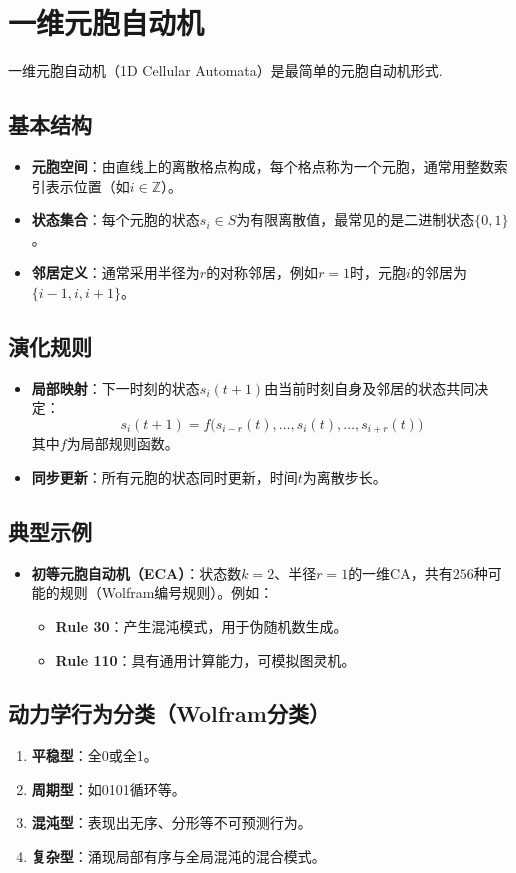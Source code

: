 \documentclass[forprint]{WHUBachelor}
\begin{document}
\section{一维元胞自动机}
一维元胞自动机（1D Cellular Automata）是最简单的元胞自动机形式.

\subsection{基本结构}
\begin{itemize}
    \item \textbf{元胞空间}：由直线上的离散格点构成，每个格点称为一个元胞，通常用整数索引表示位置（如$i \in \mathbb{Z}$）。
    \item \textbf{状态集合}：每个元胞的状态$s_i \in S$为有限离散值，最常见的是二进制状态$\{0,1\}$。
    \item \textbf{邻居定义}：通常采用半径为$r$的对称邻居，例如$r=1$时，元胞$i$的邻居为$\{i-1, i, i+1\}$。
\end{itemize}

\subsection{演化规则}
\begin{itemize}
    \item \textbf{局部映射}：下一时刻的状态$s_i(t+1)$由当前时刻自身及邻居的状态共同决定：
    $$
    s_i(t+1) = f\big(s_{i-r}(t), \ldots, s_i(t), \ldots, s_{i+r}(t)\big)
    $$
    其中$f$为局部规则函数。
    \item \textbf{同步更新}：所有元胞的状态同时更新，时间$t$为离散步长。
\end{itemize}

\subsection{典型示例}
\begin{itemize}
    \item \textbf{初等元胞自动机（ECA）}：状态数$k=2$、半径$r=1$的一维CA，共有$256$种可能的规则（Wolfram编号规则）。例如：
    \begin{itemize}
        \item \textbf{Rule 30}：产生混沌模式，用于伪随机数生成。
        \item \textbf{Rule 110}：具有通用计算能力，可模拟图灵机。
    \end{itemize}
\end{itemize}

\subsection{动力学行为分类（Wolfram分类）}
\begin{enumerate}
    \item \textbf{平稳型}：全0或全1。
    \item \textbf{周期型}：如0101循环等。
    \item \textbf{混沌型}：表现出无序、分形等不可预测行为。
    \item \textbf{复杂型}：涌现局部有序与全局混沌的混合模式。
\end{enumerate}
\end{document}
